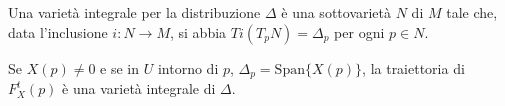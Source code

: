 \begin{definition}
 Una varietà integrale per la distribuzione $\Delta$ è una sottovarietà $N$ di $M$ tale che, data l'inclusione $i:N\to M$, si abbia $Ti(T_pN)=\Delta_p$ per ogni $p\in N$.
\end{definition}

Se $X(p)\neq 0$ e se in $U$ intorno di $p$, $\Delta_p=\text{Span}\{X(p)\}$, la traiettoria di $F_X^t(p)$ è una varietà integrale di $\Delta$. 






























